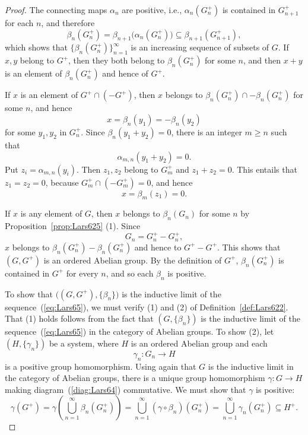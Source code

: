 \documentclass{book}
\begin{document}
\begin{proof}
  The connecting maps $\alpha_n$ are positive, i.e.,
  $\alpha_n(G_n^+)$ is contained in $G_{n+1}^+$ for each $n$, and
  therefore
  \[
    \beta_n(G_n^+)
    =\beta_{n+1}\bigl(\alpha_n(G_n^+)\bigr)
    \subseteq\beta_{n+1}(G_{n+1}^+),
  \]
  which shows that $\{\beta_n(G_n^+)\}_{n=1}^{\infty}$ is an increasing
  sequence of subsets of $G$. If $x,y$ belong to $G^+$, then they both
  belong to $\beta_n(G_n^+)$ for some $n$, and then $x+y$ is an element
  of $\beta_n(G_n^+)$ and hence of $G^+$.

  If $x$ is an element of $G^+\cap(-G^+)$, then $x$ belongs to
  $\beta_n(G_n^+)\cap-\beta_n(G_n^+)$ for some $n$, and hence
  \[
    x=\beta_n(y_1)=-\beta_n(y_2)
  \]
  for some $y_1,y_2$ in $G_n^+$. Since $\beta_n(y_1+y_2)=0$, there is an
  integer $m\geq n$ such that
  \[
    \alpha_{m,n}(y_1+y_2)=0.
  \]
  Put $z_i=\alpha_{m,n}(y_i)$. Then $z_1,z_2$ belong to $G_m^+$ and
  $z_1+z_2=0$. This entails that $z_1=z_2=0$, because
  $G_m^+\cap(-G_m^+)=0$, and hence
  \[
    x=\beta_m(z_1)=0.
  \]

  If $x$ is any element of $G$, then $x$ belongs to $\beta_n(G_n)$ for
  some $n$ by Proposition~\ref{prop:Lars625} (1). Since
  \[
    G_n=G_n^+-G_n^+,
  \]
  $x$ belongs to $\beta_n(G_n^+)-\beta_n(G_n^+)$ and hence to
  $G^+-G^+$. This shows that $(G,G^+)$ is an ordered Abelian group. By
  the definition of $G^+$, $\beta_n(G_n^+)$ is contained in $G^+$ for
  every $n$, and so each $\beta_n$ is positive.

  To show that $\bigl((G,G^+),\{\beta_n\}\bigr)$ is the inductive limit
  of the sequence~(\ref{eq:Lars65}), we must verify (1) and (2) of
  Definition~\ref{def:Lars622}. That (1) holds follows from the fact that
  $(G,\{\beta_n\})$ is the inductive limit of the sequence~(\ref{eq:Lars65}) in the
  category of Abelian groups. To show (2), let $(H,\{\gamma_n\})$ be a
  system, where $H$ is an ordered Abelian group and each
  \[
    \gamma_n\colon G_n\longrightarrow H
  \]
  is a positive group homomorphism. Using again that $G$ is the
  inductive limit in the category of Abelian groups, there is a unique
  group homomorphism $\gamma\colon G\to H$ making diagram~(\ref{diag:Lars64})
  commutative. We must show that $\gamma$ is positive:
  \[
    \gamma(G^+)
    =\gamma\left(\bigcup_{n=1}^{\infty}\beta_n(G_n^+)\right)
    =\bigcup_{n=1}^{\infty}(\gamma\circ\beta_n)(G_n^+)
    =\bigcup_{n=1}^{\infty}\gamma_n(G_n^+)
    \subseteq H^+.
  \]
\end{proof}
\end{document}
